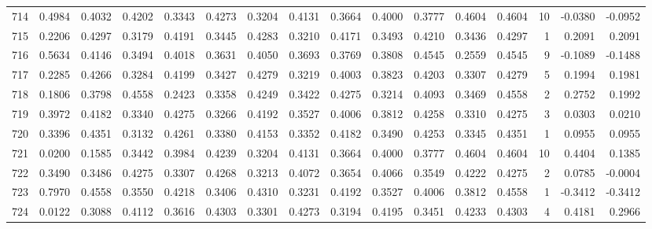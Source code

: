 \begin{tabular}{lrrrrrrrrrrrrrrr}
714 &      0.4984 &  0.4032 &  0.4202 &  0.3343 &  0.4273 &  0.3204 &  0.4131 &  0.3664 &  0.4000 &  0.3777 &   0.4604 &     0.4604 &     10 &                   -0.0380 &                    -0.0952 \\
715 &      0.2206 &  0.4297 &  0.3179 &  0.4191 &  0.3445 &  0.4283 &  0.3210 &  0.4171 &  0.3493 &  0.4210 &   0.3436 &     0.4297 &      1 &                    0.2091 &                     0.2091 \\
716 &      0.5634 &  0.4146 &  0.3494 &  0.4018 &  0.3631 &  0.4050 &  0.3693 &  0.3769 &  0.3808 &  0.4545 &   0.2559 &     0.4545 &      9 &                   -0.1089 &                    -0.1488 \\
717 &      0.2285 &  0.4266 &  0.3284 &  0.4199 &  0.3427 &  0.4279 &  0.3219 &  0.4003 &  0.3823 &  0.4203 &   0.3307 &     0.4279 &      5 &                    0.1994 &                     0.1981 \\
718 &      0.1806 &  0.3798 &  0.4558 &  0.2423 &  0.3358 &  0.4249 &  0.3422 &  0.4275 &  0.3214 &  0.4093 &   0.3469 &     0.4558 &      2 &                    0.2752 &                     0.1992 \\
719 &      0.3972 &  0.4182 &  0.3340 &  0.4275 &  0.3266 &  0.4192 &  0.3527 &  0.4006 &  0.3812 &  0.4258 &   0.3310 &     0.4275 &      3 &                    0.0303 &                     0.0210 \\
720 &      0.3396 &  0.4351 &  0.3132 &  0.4261 &  0.3380 &  0.4153 &  0.3352 &  0.4182 &  0.3490 &  0.4253 &   0.3345 &     0.4351 &      1 &                    0.0955 &                     0.0955 \\
721 &      0.0200 &  0.1585 &  0.3442 &  0.3984 &  0.4239 &  0.3204 &  0.4131 &  0.3664 &  0.4000 &  0.3777 &   0.4604 &     0.4604 &     10 &                    0.4404 &                     0.1385 \\
722 &      0.3490 &  0.3486 &  0.4275 &  0.3307 &  0.4268 &  0.3213 &  0.4072 &  0.3654 &  0.4066 &  0.3549 &   0.4222 &     0.4275 &      2 &                    0.0785 &                    -0.0004 \\
723 &      0.7970 &  0.4558 &  0.3550 &  0.4218 &  0.3406 &  0.4310 &  0.3231 &  0.4192 &  0.3527 &  0.4006 &   0.3812 &     0.4558 &      1 &                   -0.3412 &                    -0.3412 \\
724 &      0.0122 &  0.3088 &  0.4112 &  0.3616 &  0.4303 &  0.3301 &  0.4273 &  0.3194 &  0.4195 &  0.3451 &   0.4233 &     0.4303 &      4 &                    0.4181 &                     0.2966 \\

\end{tabular}
